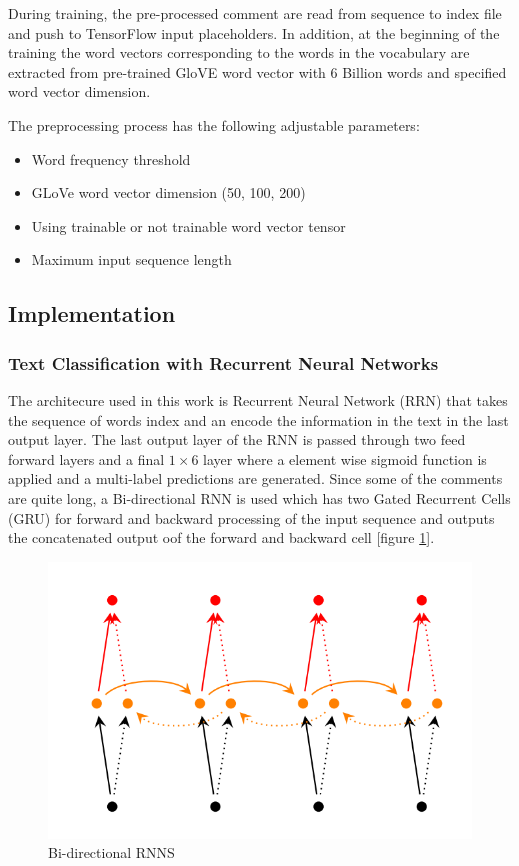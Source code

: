\documentclass{article}
\begin{document}
    During training, the pre-processed comment are read from sequence to index file and push to TensorFlow input placeholders. In addition, at the beginning of the training the word vectors corresponding to the words in the vocabulary are extracted from pre-trained GloVE word vector with $6$ Billion words and specified word vector dimension.

    The preprocessing process has the following adjustable parameters:

    \begin{itemize}
        \item Word frequency threshold
        \item GLoVe word vector dimension (50, 100, 200)
        \item Using trainable or not trainable word vector tensor
        \item Maximum input sequence length
    \end{itemize}



    \subsection{Implementation}

    \subsubsection{Text Classification with Recurrent Neural Networks}

    The architecure used in this work is Recurrent Neural Network (RRN) that takes the sequence of words index and an encode the information in the text in the last output layer. The last output layer of the RNN is passed through two feed forward layers and a final $1 \times 6$ layer where a element wise sigmoid function is applied and a multi-label predictions are generated. Since some of the comments are quite long, a Bi-directional RNN is used which has two Gated Recurrent Cells (GRU) for forward and backward processing of the input sequence and outputs the concatenated output oof the forward and backward cell [figure \ref{figure:bi-rnn}].
    
    \begin{figure}
        \centering
        \includegraphics[scale=0.6]{bi_rnn.png}
        \caption{Bi-directional RNNS}
        \label{figure:bi-rnn}
    \end{figure}
    
\end{document}
